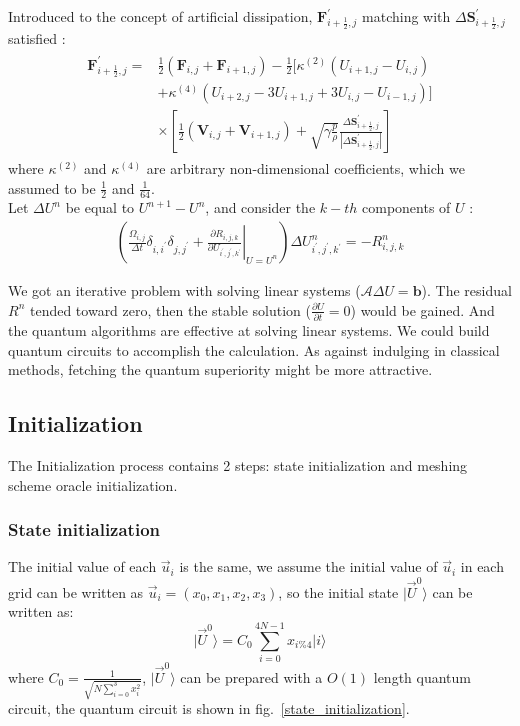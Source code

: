 \documentclass[%
 reprint,
 amsmath,amssymb,
pra,
]{revtex4-1}
\begin{document}
Introduced to the concept of artificial dissipation, $\bm{F}^\prime_{i+\frac{1}{2}, j}$ matching with $\Delta\bm{S}^\prime_{i+\frac{1}{2}, j}$ satisfied \cite{hirsch2007numerical} \cite{jameson1981numerical}:
\begin{align}
\begin{split}
    \bm{F}^\prime_{i+\frac{1}{2}, j} =& \frac{1}{2}\left(\bm{F}_{i, j} + \bm{F}_{i + 1, j}\right) - \frac{1}{2}\big[\kappa^{\left(2\right)}\left(U_{i+1, j}-U_{i, j}\right)\\
    &+\kappa^{\left(4\right)}\left(U_{i+2, j}-3 U_{i+1, j}+3 U_{i, j}-U_{i-1, j}\right)\big]\\
    &\times\left[\frac{1}{2}\left(\bm{V}_{i, j} + \bm{V}_{i + 1, j}\right) + \sqrt{\gamma \frac{p}{\rho}}\frac{\Delta\bm{S}^\prime_{i+\frac{1}{2}, j}}{\left|\Delta\bm{S}^\prime_{i+\frac{1}{2}, j}\right|}\right]
\end{split}
\end{align}
where $\kappa^{\left(2\right)}$ and $\kappa^{\left(4\right)}$ are arbitrary non-dimensional coefficients, which we assumed to be $\frac{1}{2}$ and $\frac{1}{64}$.\\
Let $\Delta U^{n}$ be equal to $U^{n+1}-U^{n}$, and consider the $k-th$ components of $U$ \cite{economon2015su2}:
\begin{align}
	\left(\frac{\Omega_{i, j}}{\Delta t}\delta_{i, i^\prime}\delta_{j, j^\prime}+\left.\frac{\partial R_{i,j,k}}{\partial U_{i^\prime,j^\prime,k^\prime}}\right|_{U=U^n}\right)\Delta U^{n}_{i^\prime,j^\prime,k^\prime} = -R^{n}_{i,j,k}
\end{align}

We got an iterative problem with solving linear systems ($\mathcal{A} \Delta U = \bm{b}$). The residual $R^{n}$ tended toward zero, then the stable solution ($\frac{\partial U}{\partial t} = 0$) would be gained. And the quantum algorithms are effective at solving linear systems. We could build quantum circuits to accomplish the calculation. As against indulging in classical methods, fetching the quantum superiority might be more attractive.



\subsection{Initialization}

The Initialization process contains 2 steps: state initialization and meshing scheme oracle initialization.
\subsubsection{State initialization}
The initial value of  each $\vec{u}_i$ is the same, we assume the initial value of $\vec{u}_i$ in each grid can be written as $\vec{u}_i=(x_0,x_1,x_2,x_3)$, so the initial state  $|\vec{U}^0\rangle$ can be written as:
$$
|\vec{U}^0\rangle=C_0\sum_{i=0}^{4N-1}{x_{i\%4}|i\rangle}
$$
where $C_0=\frac{1}{\sqrt{N\sum_{i=0}^{3}{x_i^2}}}$, $|\vec{U}^0\rangle$ can be prepared with a $O(1)$ length quantum circuit, the quantum circuit is shown in fig.~\ref{state_initialization}.
\end{document}

